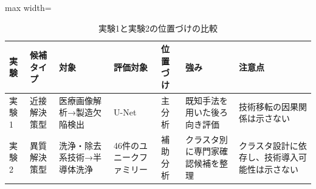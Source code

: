 \begin{table}[tbp]
\centering
\small
\caption{実験1と実験2の位置づけの比較}
\label{tab:experiment1_experiment2_comparison_table}
\begin{adjustbox}{max width=\textwidth}
\begin{tabular}{lllllll}
\toprule
実験 & 候補タイプ & 対象 & 評価対象 & 位置づけ & 強み & 注意点 \\
\midrule
実験1 & 近接解決策型 & 医療画像解析→製造欠陥検出 & U-Net & 主分析 & 既知手法を用いた後ろ向き評価 & 技術移転の因果関係は示さない \\
実験2 & 異質解決策型 & 洗浄・除去系技術→半導体洗浄 & 46件のユニークファミリー & 補助分析 & クラスタ別に専門家確認候補を整理 & クラスタ設計に依存し、技術導入可能性は示さない \\
\bottomrule
\end{tabular}
\end{adjustbox}
\end{table}
